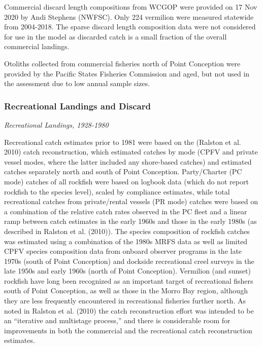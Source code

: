 \documentclass[11pt,
  english,
  a4paper,
]{article}
\begin{document}
Commercial discard length compositions from WCGOP were provided on 17 Nov 2020 by Andi Stephens (NWFSC). Only 224 vermilion were measured statewide from 2004-2018. The sparse discard length composition data were not considered for use in the model as discarded catch is a small fraction of the overall commercial landings.

Otoliths collected from commercial fisheries north of Point Conception were provided by the Pacific States Fisheries Commission and aged, but not used in the assessment due to low annual sample sizes.


\hypertarget{recreational-landings-and-discard}{%
\subsubsection{Recreational Landings and Discard}\label{recreational-landings-and-discard}}

\leavevmode\tagmcend\tagstructend

\emph{Recreational Landings, 1928-1980}

Recreational catch estimates prior to 1981 were based on the {(Ralston et al. 2010)\leavevmode\tagmcend\tagstructend} catch reconstruction, which estimated catches by mode (CPFV and private vessel modes, where the latter included any shore-based catches) and estimated catches separately north and south of Point Conception. Party/Charter (PC mode) catches of all rockfish were based on logbook data (which do not report rockfish to the species level), scaled by compliance estimates, while total recreational catches from private/rental vessels (PR mode) catches were based on a combination of the relative catch rates observed in the PC fleet and a linear ramp between catch estimates in the early 1960s and those in the early 1980s (as described in Ralston et al. {(2010)\leavevmode\tagmcend\tagstructend}). The species composition of rockfish catches was estimated using a combination of the 1980s MRFS data as well as limited CPFV species composition data from onboard observer programs in the late 1970s (south of Point Conception) and dockside recreational creel surveys in the late 1950s and early 1960s (north of Point Conception). Vermilion (and sunset) rockfish have long been recognized as an important target of recreational fishers south of Point Conception, as well as those in the Morro Bay region, although they are less frequently encountered in recreational fisheries further north. As noted in Ralston et al. {(2010)\leavevmode\tagmcend\tagstructend} the catch reconstruction effort was intended to be an ``iterative and multistage process,'' and there is considerable room for improvements in both the commercial and the recreational catch reconstruction estimates.
\end{document}
